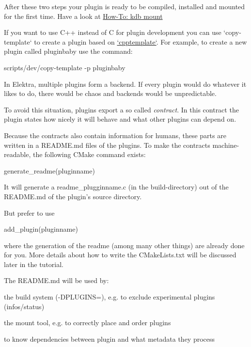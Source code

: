 After these two steps your plugin is ready to be compiled, installed and mounted for the first time. Have a look at \hyperlink{doc_tutorials_mount_md}{How-\/\+To\+: kdb mount}

If you want to use C++ instead of C for plugin development you can use `copy-\/template` to create a plugin based on \hyperlink{autotoc_md108_src_plugins_cpptemplate_README_md}{`cpptemplate`}. For example, to create a new plugin called {\ttfamily pluginbaby} use the command\+:


\begin{DoxyCode}
scripts/dev/copy-template -p pluginbaby
\end{DoxyCode}


In Elektra, multiple plugins form a backend. If every plugin would do whatever it likes to do, there would be chaos and backends would be unpredictable.

To avoid this situation, plugins export a so called {\itshape contract}. In this contract the plugin states how nicely it will behave and what other plugins can depend on.

Because the contracts also contain information for humans, these parts are written in a {\ttfamily R\+E\+A\+D\+M\+E.\+md} files of the plugins. To make the contracts machine-\/readable, the following C\+Make command exists\+:


\begin{DoxyCode}
generate\_readme(pluginname)
\end{DoxyCode}


It will generate a {\ttfamily readme\+\_\+plugginname.\+c} (in the build-\/directory) out of the {\ttfamily R\+E\+A\+D\+M\+E.\+md} of the plugin’s source directory.

But prefer to use


\begin{DoxyCode}
add\_plugin(pluginname)
\end{DoxyCode}


where the generation of the readme (among many other things) are already done for you. More details about how to write the {\ttfamily C\+Make\+Lists.\+txt} will be discussed later in the tutorial.

The {\ttfamily R\+E\+A\+D\+M\+E.\+md} will be used by\+:


\begin{DoxyItemize}
\item the build system ({\ttfamily -\/\+D\+P\+L\+U\+G\+I\+NS=}), e.\+g. to exclude experimental plugins ({\ttfamily infos/status})
\item the mount tool, e.\+g. to correctly place and order plugins
\item to know dependencies between plugin and what metadata they process
\end{DoxyItemize}


